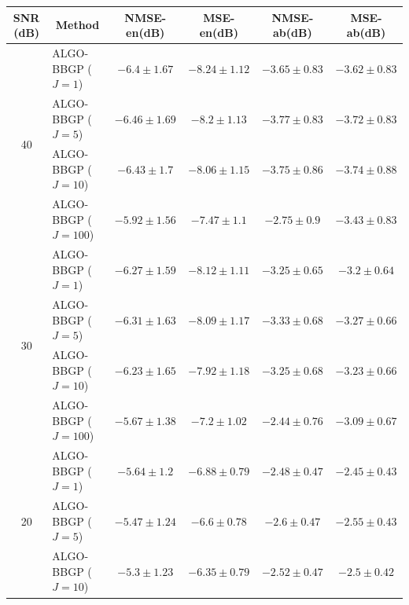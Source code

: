 \newpage

\begin{table}[h]
\centering
\begin{adjustbox}{max width=\textwidth}
\begin{tabular}{|c|l|c|c|c|c|}
\hline
SNR (dB)            & \multicolumn{1}{c|}{Method}  & NMSE-en(dB)         & MSE-en(dB)          & NMSE-ab(dB)         & MSE-ab(dB)          \tabularnewline \hline
\multirow{4}{*}{40} & ALGO-BBGP ($J=1$)            & $-6.4     \pm 1.67$ & $-8.24    \pm 1.12$ & $-3.65    \pm 0.83$ & $-3.62    \pm 0.83$ \tabularnewline
                    & ALGO-BBGP ($J=5$)            & $-6.46    \pm 1.69$ & $-8.2     \pm 1.13$ & $-3.77    \pm 0.83$ & $-3.72    \pm 0.83$ \tabularnewline
                    & ALGO-BBGP ($J=10$)           & $-6.43    \pm 1.7$  & $-8.06    \pm 1.15$ & $-3.75    \pm 0.86$ & $-3.74    \pm 0.88$ \tabularnewline
                    & ALGO-BBGP ($J=100$)          & $-5.92    \pm 1.56$ & $-7.47    \pm 1.1$  & $-2.75    \pm 0.9$  & $-3.43    \pm 0.83$ \tabularnewline \hline
\multirow{4}{*}{30} & ALGO-BBGP ($J=1$)            & $-6.27    \pm 1.59$ & $-8.12    \pm 1.11$ & $-3.25    \pm 0.65$ & $-3.2     \pm 0.64$ \tabularnewline
                    & ALGO-BBGP ($J=5$)            & $-6.31    \pm 1.63$ & $-8.09    \pm 1.17$ & $-3.33    \pm 0.68$ & $-3.27    \pm 0.66$ \tabularnewline
                    & ALGO-BBGP ($J=10$)           & $-6.23    \pm 1.65$ & $-7.92    \pm 1.18$ & $-3.25    \pm 0.68$ & $-3.23    \pm 0.66$ \tabularnewline
                    & ALGO-BBGP ($J=100$)          & $-5.67    \pm 1.38$ & $-7.2     \pm 1.02$ & $-2.44    \pm 0.76$ & $-3.09    \pm 0.67$ \tabularnewline \hline
\multirow{4}{*}{20} & ALGO-BBGP ($J=1$)            & $-5.64    \pm 1.2$  & $-6.88    \pm 0.79$ & $-2.48    \pm 0.47$ & $-2.45    \pm 0.43$ \tabularnewline
                    & ALGO-BBGP ($J=5$)            & $-5.47    \pm 1.24$ & $-6.6     \pm 0.78$ & $-2.6     \pm 0.47$ & $-2.55    \pm 0.43$ \tabularnewline
                    & ALGO-BBGP ($J=10$)           & $-5.3     \pm 1.23$ & $-6.35    \pm 0.79$ & $-2.52    \pm 0.47$ & $-2.5     \pm 0.42$ \tabularnewline

\end{tabular}
\end{adjustbox}
\end{table}
